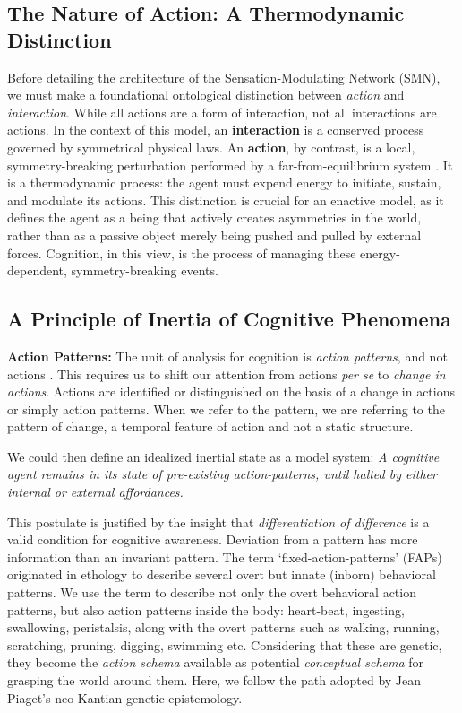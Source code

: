 \subsection{The Nature of Action: A Thermodynamic Distinction}
\label{subsec:action_nature}
Before detailing the architecture of the Sensation-Modulating Network (SMN), we must make a foundational ontological distinction between \textit{action} and \textit{interaction}. While all actions are a form of interaction, not all interactions are actions. In the context of this model, an \textbf{interaction} is a conserved process governed by symmetrical physical laws. An \textbf{action}, by contrast, is a local, symmetry-breaking perturbation performed by a far-from-equilibrium system \cite{prigogine2018order}. It is a thermodynamic process: the agent must expend energy to initiate, sustain, and modulate its actions. This distinction is crucial for an enactive model, as it defines the agent as a being that actively creates asymmetries in the world, rather than as a passive object merely being pushed and pulled by external forces. Cognition, in this view, is the process of managing these energy-dependent, symmetry-breaking events.

\subsection{A Principle of Inertia of Cognitive Phenomena}
\textbf{Action Patterns: }The unit of analysis for cognition is \textit{action patterns}, and not actions \cite{bateson2000steps}.  This requires us to shift our attention from actions \textit{per se} to \textit{change in actions}. Actions are identified or distinguished on the basis of a change in actions or simply action patterns. When we refer to the pattern, we are referring to the pattern of change, a temporal feature of action and not a static structure. 

We could then define an idealized inertial state as a model system:  \textit{A cognitive agent remains in its state of pre-existing action-patterns, until halted by either internal or external affordances.} 

This postulate is justified by the insight that \textit{differentiation of difference} is a valid condition for cognitive awareness.\cite{bateson2000steps} Deviation from a pattern has more information than an invariant pattern. The term `fixed-action-patterns' (FAPs) originated in ethology to describe several overt but innate (inborn) behavioral patterns. We use the term to describe not only the overt behavioral action patterns, but also action patterns inside the body: heart-beat, ingesting, swallowing, peristalsis, along with the overt patterns such as walking, running, scratching, pruning, digging, swimming etc.  Considering that these are genetic, they become the \textit{action schema} available as potential \textit{conceptual schema} for grasping the world around them.  Here, we follow the path adopted by Jean Piaget's neo-Kantian genetic epistemology.\cite{piaget-biology-knowledge}

